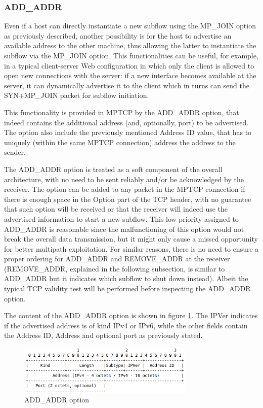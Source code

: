 \subsubsection{ADD\_ADDR}
Even if a host can directly instantiate a new subflow using the MP\_JOIN option as previously described, another possibility is for the host to advertise an available address to the other machine, thus allowing the latter to instantiate the subflow via the MP\_JOIN option.
This functionalities can be useful, for example, in a typical client-server Web configuration in which only the client is allowed to open new connections with the server: if a new interface becomes available at the server, it can dynamically advertise it to the client which in turns can send the SYN+MP\_JOIN packet for subflow initiation.


This functionality is provided in MPTCP by the ADD\_ADDR option, that indeed contains the additional address (and, optionally, port) to be advertised. The option also include the previously mentioned Address ID value, that has to uniquely (within the same MPTCP connection) address the address to the sender.


The ADD\_ADDR option is treated as a soft component of the overall architecture, with no need to be sent reliably and/or be acknowledged by the receiver. The option can be added to any packet in the MPTCP connection if there is enough space in the Option part of the TCP header, with no guarantee that such option will be received or that the receiver will indeed use the advertised information to start a new subflow. This low priority assigned to ADD\_ADDR is reasonable since the malfunctioning of this option would not break the overall data transmission, but it might only cause a missed opportunity for better multipath exploitation. For similar reasons, there is no need to ensure a proper ordering for ADD\_ADDR and REMOVE\_ADDR at the receiver (REMOVE\_ADDR, explained in the following subsection, is similar to ADD\_ADDR but it indicates which subflow to shut down instead). Albeit the typical TCP validity test will be performed before inspecting the ADD\_ADDR option.

The content of the ADD\_ADDR option is shown in figure \ref{fig:addaddropt}. The IPVer indicates if the advertised address is of kind IPv4 or IPv6, while the other fields contain the Address ID, Address and optional port as previously stated.

\begin{figure}[!htb]
\centering
\includegraphics[width=0.75\textwidth]{images/addaddropt}
\caption{ADD\_ADDR option}
\label{fig:addaddropt}
\end{figure}

